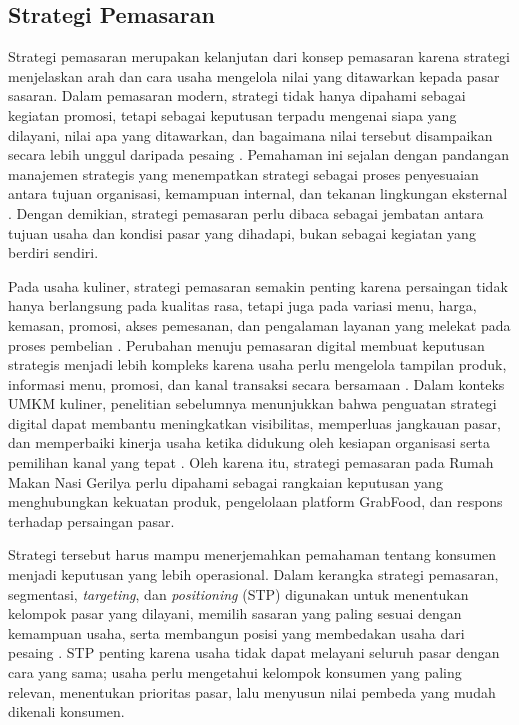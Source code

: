 \subsection{Strategi Pemasaran}
Strategi pemasaran merupakan kelanjutan dari konsep pemasaran karena strategi menjelaskan arah dan cara usaha mengelola nilai yang ditawarkan kepada pasar sasaran. Dalam pemasaran modern, strategi tidak hanya dipahami sebagai kegiatan promosi, tetapi sebagai keputusan terpadu mengenai siapa yang dilayani, nilai apa yang ditawarkan, dan bagaimana nilai tersebut disampaikan secara lebih unggul daripada pesaing \parencite{kotler2023principlesmarketing}. Pemahaman ini sejalan dengan pandangan manajemen strategis yang menempatkan strategi sebagai proses penyesuaian antara tujuan organisasi, kemampuan internal, dan tekanan lingkungan eksternal \parencite{david2023strategicmanagement}. Dengan demikian, strategi pemasaran perlu dibaca sebagai jembatan antara tujuan usaha dan kondisi pasar yang dihadapi, bukan sebagai kegiatan yang berdiri sendiri.

Pada usaha kuliner, strategi pemasaran semakin penting karena persaingan tidak hanya berlangsung pada kualitas rasa, tetapi juga pada variasi menu, harga, kemasan, promosi, akses pemesanan, dan pengalaman layanan yang melekat pada proses pembelian \parencite{regina2025kuliner,sophia2025rendanggadih}. Perubahan menuju pemasaran digital membuat keputusan strategis menjadi lebih kompleks karena usaha perlu mengelola tampilan produk, informasi menu, promosi, dan kanal transaksi secara bersamaan \parencite{chaffey2022digitalmarketing,suharjo2020bogorsnacks}. Dalam konteks UMKM kuliner, penelitian sebelumnya menunjukkan bahwa penguatan strategi digital dapat membantu meningkatkan visibilitas, memperluas jangkauan pasar, dan memperbaiki kinerja usaha ketika didukung oleh kesiapan organisasi serta pemilihan kanal yang tepat \parencite{regina2025kuliner,roslam2021markisaaurora}. Oleh karena itu, strategi pemasaran pada Rumah Makan Nasi Gerilya perlu dipahami sebagai rangkaian keputusan yang menghubungkan kekuatan produk, pengelolaan platform GrabFood, dan respons terhadap persaingan pasar.

Strategi tersebut harus mampu menerjemahkan pemahaman tentang konsumen menjadi keputusan yang lebih operasional. Dalam kerangka strategi pemasaran, segmentasi, \textit{targeting}, dan \textit{positioning} (STP) digunakan untuk menentukan kelompok pasar yang dilayani, memilih sasaran yang paling sesuai dengan kemampuan usaha, serta membangun posisi yang membedakan usaha dari pesaing \parencite{kotler2023principlesmarketing}. STP penting karena usaha tidak dapat melayani seluruh pasar dengan cara yang sama; usaha perlu mengetahui kelompok konsumen yang paling relevan, menentukan prioritas pasar, lalu menyusun nilai pembeda yang mudah dikenali konsumen.

